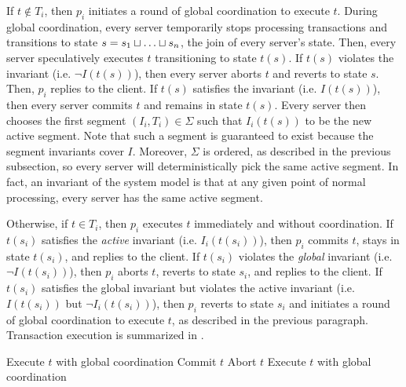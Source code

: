 If $t \notin T_i$, then $p_i$ initiates a round of global coordination to
execute $t$. During global coordination, every server temporarily stops
processing transactions and transitions to state $s = s_1 \sqcup \ldots \sqcup
s_n$, the join of every server's state. Then, every server speculatively
executes $t$ transitioning to state $t(s)$. If $t(s)$ violates the invariant
(i.e.  $\lnot I(t(s))$), then every server aborts $t$ and reverts to state $s$.
Then, $p_i$ replies to the client. If $t(s)$ satisfies the invariant (i.e.
$I(t(s))$), then every server commits $t$ and remains in state $t(s)$. Every
server then chooses the first segment $(I_i, T_i) \in \Sigma$ such that
$I_i(t(s))$ to be the new active segment.  Note that such a segment is
guaranteed to exist because the segment invariants cover $I$. Moreover,
$\Sigma$ is ordered, as described in the previous subsection, so every server
will deterministically pick the same active segment. In fact, an invariant of
the system model is that at any given point of normal processing, every server
has the same active segment.

Otherwise, if $t \in T_i$, then $p_i$ executes $t$ immediately and without
coordination.  If $t(s_i)$ satisfies the \emph{active} invariant (i.e.
$I_i(t(s_i))$), then $p_i$ commits $t$, stays in state $t(s_i)$, and replies to
the client. If $t(s_i)$ violates the \emph{global} invariant (i.e. $\lnot
I(t(s_i))$), then $p_i$ aborts $t$, reverts to state $s_i$, and replies to the
client. If $t(s_i)$ satisfies the global invariant but violates the active
invariant (i.e.  $I(t(s_i))$ but $\lnot I_i(t(s_i))$), then $p_i$ reverts to
state $s_i$ and initiates a round of global coordination to execute $t$, as
described in the previous paragraph.  Transaction execution is summarized in
.

\begin{algorithm}[t]
  \caption{%
    Transaction execution in the segmented \invariantconfluence{} system model}%
  \begin{algorithmic}
      \State Execute $t$ with global coordination
    \Else{}
       Commit $t$
       Abort $t$
      \Else{} Execute $t$ with global coordination
      \EndIf{}
    \EndIf{}
  \end{algorithmic}
\end{algorithm}

